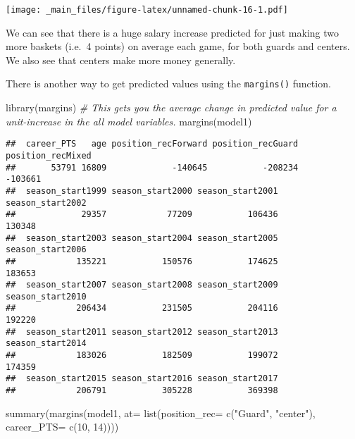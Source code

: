\documentclass[
]{book}
\newenvironment{Shaded}{\begin{snugshade}}{\end{snugshade}}
\newcommand{\AttributeTok}[1]{\textcolor[rgb]{0.77,0.63,0.00}{#1}}
\newcommand{\CommentTok}[1]{\textcolor[rgb]{0.56,0.35,0.01}{\textit{#1}}}
\newcommand{\DecValTok}[1]{\textcolor[rgb]{0.00,0.00,0.81}{#1}}
\newcommand{\FunctionTok}[1]{\textcolor[rgb]{0.00,0.00,0.00}{#1}}
\newcommand{\NormalTok}[1]{#1}
\newcommand{\StringTok}[1]{\textcolor[rgb]{0.31,0.60,0.02}{#1}}
\begin{document}
\texttt{[image: \_main\_files/figure-latex/unnamed-chunk-16-1.pdf]}

We can see that there is a huge salary increase predicted for just making two more baskets (i.e.~4 points) on average each game, for both guards and centers. We also see that centers make more money generally.

There is another way to get predicted values using the \texttt{margins()} function.

\begin{Shaded}
\begin{Highlighting}[]
\FunctionTok{library}\NormalTok{(margins)}
\CommentTok{\# This gets you the average change in predicted value for a unit{-}increase in the all model variables.}
\FunctionTok{margins}\NormalTok{(model1)}
\end{Highlighting}
\end{Shaded}

\begin{verbatim}
##  career_PTS   age position_recForward position_recGuard position_recMixed
##       53791 16809             -140645           -208234           -103661
##  season_start1999 season_start2000 season_start2001 season_start2002
##             29357            77209           106436           130348
##  season_start2003 season_start2004 season_start2005 season_start2006
##            135221           150576           174625           183653
##  season_start2007 season_start2008 season_start2009 season_start2010
##            206434           231505           204116           192220
##  season_start2011 season_start2012 season_start2013 season_start2014
##            183026           182509           199072           174359
##  season_start2015 season_start2016 season_start2017
##            206791           305228           369398
\end{verbatim}

\begin{Shaded}
\begin{Highlighting}[]
\FunctionTok{summary}\NormalTok{(}\FunctionTok{margins}\NormalTok{(model1, }\AttributeTok{at=} \FunctionTok{list}\NormalTok{(}\AttributeTok{position\_rec=} \FunctionTok{c}\NormalTok{(}\StringTok{"Guard"}\NormalTok{, }\StringTok{"center"}\NormalTok{),}
                         \AttributeTok{career\_PTS=} \FunctionTok{c}\NormalTok{(}\DecValTok{10}\NormalTok{, }\DecValTok{14}\NormalTok{))))}
\end{Highlighting}
\end{Shaded}
\end{document}
